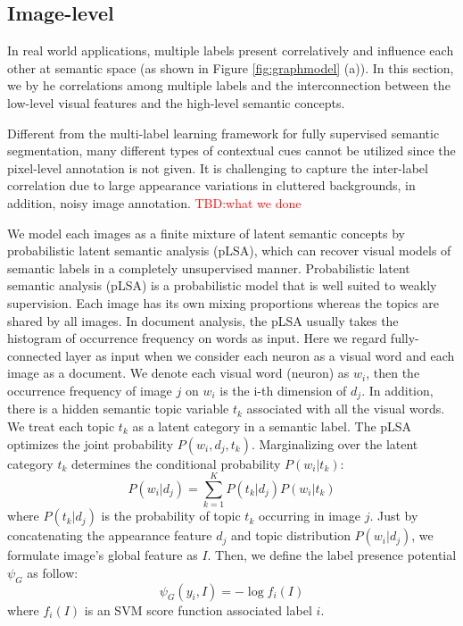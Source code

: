 \subsection{Image-level}
In real world applications, multiple labels present correlatively and influence each other at semantic space (as shown in Figure \ref{fig:graphmodel} (a)). In this section, we by he correlations among multiple labels and the interconnection between the low-level visual features and the high-level semantic concepts.

Different from the multi-label learning framework for fully supervised semantic segmentation, many different types of contextual cues cannot be utilized since the pixel-level annotation is not given. It is challenging to capture the inter-label correlation due to large appearance variations in cluttered backgrounds, in addition, noisy image annotation. {\textcolor{red}{TBD:what we done}}

We model each images as a finite mixture of latent semantic concepts by probabilistic latent semantic analysis (pLSA), which can recover visual models of semantic labels  in a completely unsupervised manner. Probabilistic latent semantic analysis (pLSA) is a probabilistic model that is well suited to weakly supervision. Each image has its own mixing proportions whereas the topics are shared by all images. In document analysis, the pLSA usually takes the histogram of occurrence frequency on words as input. Here we regard fully-connected layer as input when we consider each neuron as a visual word and each image as a document. We denote each visual word (neuron) as $w_i$, then the occurrence frequency of image $j$ on $w_i$ is the i-th dimension of $d_j$. In addition, there is a hidden semantic topic variable $t_k$ associated with all the visual words. We treat each topic $t_k$ as a latent category in a semantic label. The pLSA optimizes the joint probability $P(w_i,d_j,t_k)$. Marginalizing over the latent category $t_k$ determines the conditional probability $P(w_i|t_k)$:
\begin{equation}
  P(w_i|d_j) = \sum_{k=1}^K{P(t_k|d_j)P(w_i|t_k)}
\end{equation}
where $P(t_k|d_j)$ is the probability of topic $t_k$ occurring in image $j$.
Just by concatenating the appearance feature $d_j$ and topic distribution $P(w_i|d_j)$, we formulate image's global feature as $I$. Then, we define the label presence potential $\psi_{G}$ as follow:
\begin{equation}
    \psi_{G}(y_i,I) = -\log f_{i}(I)
\end{equation}
where $f_{i}(I)$ is an SVM score function associated label $i$.

